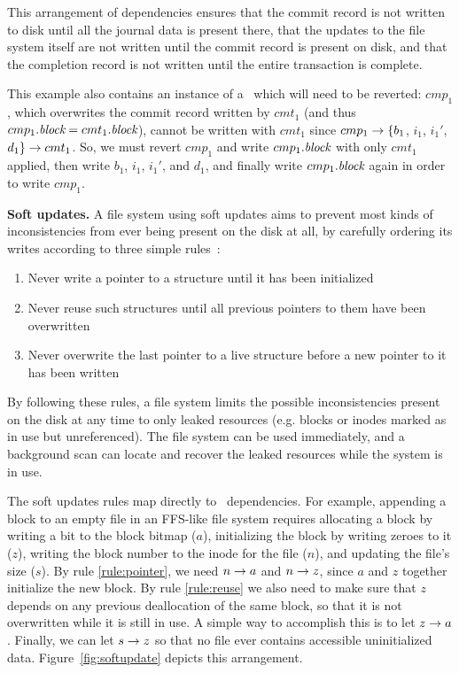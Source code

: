 This arrangement of dependencies ensures that the commit record is not written
to disk until all the journal data is present there, that the updates to the
file system itself are not written until the commit record is present on disk,
and that the completion record is not written until the entire transaction is
complete.

This example also contains an instance of a \patch\ which will need to be
reverted: $cmp_1$, which overwrites the commit record written by $cmt_1$ (and
thus $cmp_1.\textit{block} = cmt_1.\textit{block}$), cannot be written with $cmt_1$ since
$cmp_1 \rightarrow \{b_1$, $i_1$, $i_1'$, $d_1\} \rightarrow cmt_1$.
%
So, we must revert $cmp_1$ and write $cmp_1.\textit{block}$ with only $cmt_1$ applied,
then write $b_1$, $i_1$, $i_1'$, and $d_1$, and finally write $cmp_1.\textit{block}$
again in order to write $cmp_1$.

\textbf{Soft updates.}
%
A file system using soft updates aims to prevent most kinds of inconsistencies
from ever being present on the disk at all, by carefully ordering its writes
according to three simple rules~\cite{ganger00soft}:

\begin{enumerate}
\item \label{rule:pointer} Never write a pointer to a structure until it has been initialized
\item \label{rule:reuse} Never reuse such structures until all previous pointers to them have been overwritten
\item \label{rule:overwrite} Never overwrite the last pointer to a live structure before a new pointer to it has been written
\end{enumerate}

\noindent
By following these rules, a file system limits the possible inconsistencies
present on the disk at any time to only leaked resources (e.g. blocks or inodes
marked as in use but unreferenced). The file system can be used immediately,
and a background scan can locate and recover the leaked resources while the
system is in use.

The soft updates rules map directly to \patch\ dependencies.
%
For example, appending a block to an empty file in an FFS-like file system
requires allocating a block by writing a bit to the block bitmap ($a$),
initializing the block by writing zeroes to it ($z$), writing the block number
to the inode for the file ($n$), and updating the file's size ($s$).
%
By rule \ref{rule:pointer}, we need $n \rightarrow a$ and $n \rightarrow z$, since
$a$ and $z$ together initialize the new block.
%
By rule \ref{rule:reuse} we also need to make sure that $z$ depends on any
previous deallocation of the same block, so that it is not overwritten while
it is still in use.
%
A simple way to accomplish this is to let $z \rightarrow a$.
%
Finally, we can let $s \rightarrow z$ so that no file ever contains accessible
uninitialized data.
%
Figure~\ref{fig:softupdate} depicts this arrangement.

